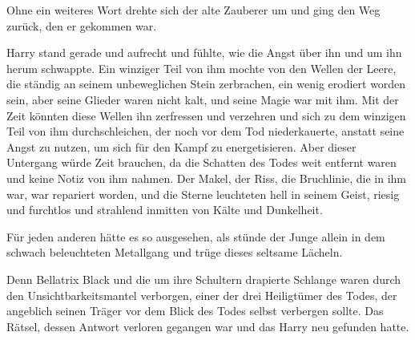 Ohne ein weiteres Wort drehte sich der alte Zauberer um und ging den Weg zurück, den er gekommen war.

\later

Harry stand gerade und aufrecht und fühlte, wie die Angst über ihn und um ihn herum schwappte. Ein winziger Teil von ihm mochte von den Wellen der Leere, die ständig an seinem unbeweglichen Stein zerbrachen, ein wenig erodiert worden sein, aber seine Glieder waren nicht kalt, und seine Magie war mit ihm. Mit der Zeit könnten diese Wellen ihn zerfressen und verzehren und sich zu dem winzigen Teil von ihm durchschleichen, der noch vor dem Tod niederkauerte, anstatt seine Angst zu nutzen, um sich für den Kampf zu energetisieren. Aber dieser Untergang würde Zeit brauchen, da die Schatten des Todes weit entfernt waren und keine Notiz von ihm nahmen. Der Makel, der Riss, die Bruchlinie, die in ihm war, war repariert worden, und die Sterne leuchteten hell in seinem Geist, riesig und furchtlos und strahlend inmitten von Kälte und Dunkelheit.

Für jeden anderen hätte es so ausgesehen, als stünde der Junge allein in dem schwach beleuchteten Metallgang und trüge dieses seltsame Lächeln.

Denn Bellatrix Black und die um ihre Schultern drapierte Schlange waren durch den Unsichtbarkeitsmantel verborgen, einer der drei Heiligtümer des Todes, der angeblich seinen Träger vor dem Blick des Todes selbst verbergen sollte. Das Rätsel, dessen Antwort verloren gegangen war und das Harry neu gefunden hatte.

